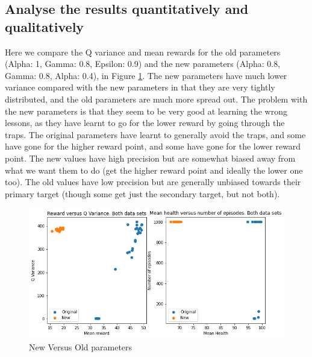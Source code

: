\documentclass[a4pape, 11pt, english]{article}
\begin{document}
\subsection{Analyse the results quantitatively and qualitatively}
Here we compare the Q variance and mean rewards for the old parameters (Alpha: 1, Gamma: 0.8, Epsilon: 0.9) and the new parameters (Alpha: 0.8, Gamma: 0.8, Alpha: 0.4), in Figure \ref{fig:bothData}. The new parameters have much lower variance compared with the new parameters in that they are very tightly distributed, and the old parameters are much more spread out. The problem with the new parameters is that they seem to be very good at learning the wrong lessons, as they have learnt to go for the lower reward by going through the traps. The original parameters have learnt to generally avoid the traps, and some have gone for the higher reward point, and some have gone for the lower reward point. The new values have high precision but are somewhat biased away from what we want them to do (get the higher reward point and ideally the lower one too). The old values have low precision but are generally unbiased towards their primary target (though some get just the secondary target, but not both).



\begin{figure}[h!]
	\begin{center}
		\includegraphics[scale=0.8]{img/bothData.png}
		\caption{New Versus Old parameters}
		\label{fig:bothData}
	\end{center}
\end{figure}
\end{document}

